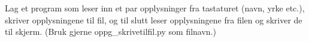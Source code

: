%
%
Lag et program som leser inn et par opplysninger fra tastaturet (navn, yrke etc.), skriver opplysningene til fil, og til slutt leser
opplysningene fra filen og skriver de til skjerm. (Bruk gjerne oppg\_{}skrivetilfil.py som filnavn.)
